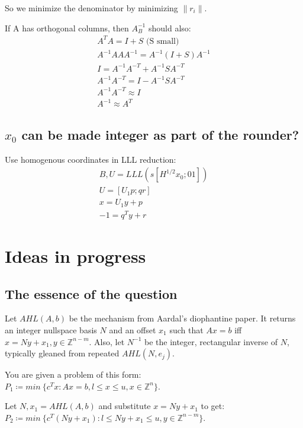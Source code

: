 \documentclass[11pt]{article}
\theoremstyle{definition}
\theoremstyle{remark}
\begin{document}
So we minimize the denominator by minimizing $\| r_i \|$.

If A has orthogonal columns, then $A_B^{-1}$ should also:
\begin{align}
    A^T A = I + S \text{ (S small)} \\
    A^{-1} A A A^{-1} = A^{-1} (I + S) A^{-1} \\
    I = A^{-1} A^{-T} + A^{-1} S A^{-T} \\
    A^{-1} A^{-T} = I - A^{-1}  S A^{-T} \\
    A^{-1} A^{-T} \approx I \\
    A^{-1} \approx A^{T}
\end{align}

\subsection{$x_0$ can be made integer as part of the rounder?}
Use homogenous coordinates in LLL reduction:
\begin{align}
    B, U = LLL(s [H^{1/2} x_0; 0 1]) \\
    U = [U_1 p; q r] \\
    x=U_1 y + p \\
    -1 = q^T y + r
\end{align}

\pagebreak

\section{Ideas in progress}

\subsection{The essence of the question}

Let $AHL(A, b)$ be the mechanism from Aardal's diophantine paper. It returns an integer nullspace basis $N$ and an offset $x_1$ such that $Ax=b$ iff $x = Ny + x_1, y \in \mathbb{Z}^{n-m}$.
Also, let $N^{-1}$ be the integer, rectangular inverse of $N$, typically gleaned from repeated $AHL(N, e_j)$.

You are given a problem of this form:\\
$P_1 \coloneqq min~\{ c^T x : Ax=b, l \leq x \leq u, x \in \mathbb{Z}^n \}$.

Let $N, x_1 = AHL(A, b)$ and substitute $x = Ny + x_1$ to get:\\
$P_2 \coloneqq min~\{ c^T (Ny + x_1) : l \leq Ny + x_1 \leq u, y \in \mathbb{Z}^{n-m} \}$.
\end{document}

